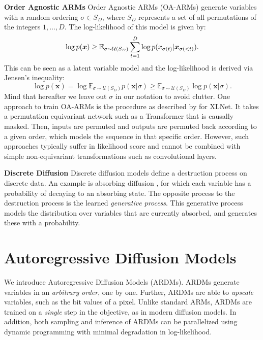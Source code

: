 \documentclass{article} \usepackage{iclr2022_conference,times}
\def\vx{{\bm{x}}}
\begin{document}
\textbf{Order Agnostic ARMs} \hspace{.2cm}
\noindent Order Agnostic ARMs (OA-ARMs) \citep{uria2014adeeptractable} generate variables with a random ordering $\sigma \in S_D$, where $S_D$ represents a set of all permutations of the integers $1, \ldots, D$. The log-likelihood of this model is given by: 
\begin{equation}
\small
\log p(\vx) \geq \mathbb{E}_{\sigma \sim \mathcal{U}(S_D)} \sum_{t=1}^{D} \log p(x_{\sigma(t)} | \vx_{\sigma(<t)}).
\label{eq:ao_arm_standard}
\end{equation}
This can be seen as a latent variable model and the log-likelihood is derived via Jensen's inequality:
$$\log p(\vx) = \log \mathbb{E}_{\sigma \sim \mathcal{U}(S_D)} p(\vx | \sigma) \geq \mathbb{E}_{\sigma \sim \mathcal{U}(S_D)} \log p(\vx | \sigma).$$ 
Mind that hereafter we leave out $\sigma$ in our notation to avoid clutter.
One approach to train OA-ARMs is the procedure as described by \citet{yang2019xlnet} for XLNet. It takes a permutation equivariant network such as a Transformer that is causally masked. Then, inputs are permuted and outputs are permuted back according to a given order, which models the sequence in that specific order. However, such approaches typically suffer in likelihood score and cannot be combined with simple non-equivariant transformations such as convolutional layers.

\textbf{Discrete Diffusion} \hspace{.2cm}
Discrete diffusion models define a destruction process on discrete data. An example is absorbing diffusion \citep{austin2021structured}, for which each variable has a probability of decaying to an absorbing state. The opposite process to the destruction process is the learned \textit{generative process}. This generative process models the distribution over variables that are currently absorbed, and generates these with a probability.

 
\section{Autoregressive Diffusion Models}
\label{sec:autoregressive_diffusion_models}
We introduce Autoregressive Diffusion Models (ARDMs). ARDMs generate variables in an \textit{arbitrary order}, one by one. Further, ARDMs are able to \textit{upscale} variables, such as the bit values of a pixel. Unlike standard ARMs, ARDMs are trained on a \textit{single} step in the objective, as in modern diffusion models. In addition, both sampling and inference of ARDMs can be parallelized using dynamic programming with minimal degradation in log-likelihood. 
\end{document}
